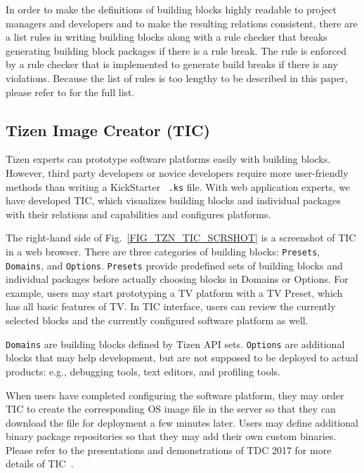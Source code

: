 In order to make the definitions of building blocks highly readable to project managers and developers and to make the resulting relations consistent, there are a list rules in writing building blocks along with a rule checker that breaks generating building block packages if there is a rule break.
The rule is enforced by a rule checker that is implemented to generate build breaks if there is any violations.
Because the list of rules is too lengthy to be described in this paper, please refer to \cite{7TizenBBRuleURL} for the full list.



\subsection{Tizen Image Creator (TIC)}\label{SS_TIC}

Tizen experts can prototype software platforms easily with building blocks.
However, third party developers or novice developers require more user-friendly methods than writing a KickStarter~\cite{9TizenKSGitURL} \texttt{.ks} file.
With web application experts, we have developed TIC, which visualizes building blocks and individual packages with their relations and capabilities and configures platforms.


The right-hand side of Fig.~\ref{FIG_TZN_TIC_SCRSHOT} is a screenshot of TIC in a web browser.
There are three categories of building blocks: \texttt{Presets}, \texttt{Domains}, and \texttt{Options}.
\texttt{Presets} provide predefined sets of building blocks and individual packages before actually choosing blocks in Domains or Options.
For example, users may start prototyping a TV platform with a TV Preset, which has all basic features of TV.
In TIC interface, users can review the currently selected blocks and  the currently configured software platform as well.


\texttt{Domains} are building blocks defined by Tizen API sets.
\texttt{Options} are additional blocks that may help development, but are not supposed to be deployed to actual products: e.g., debugging tools, text editors, and profiling tools.


When users have completed configuring the software platform, they may order TIC to create the corresponding OS image file in the server so that they can download the file for deployment a few minutes later.
Users may define additional binary package repositories so that they may add their own custom binaries.
Please refer to the presentations and demonstrations of TDC 2017 for more details of TIC~\cite{2Ham2017TDC}.


